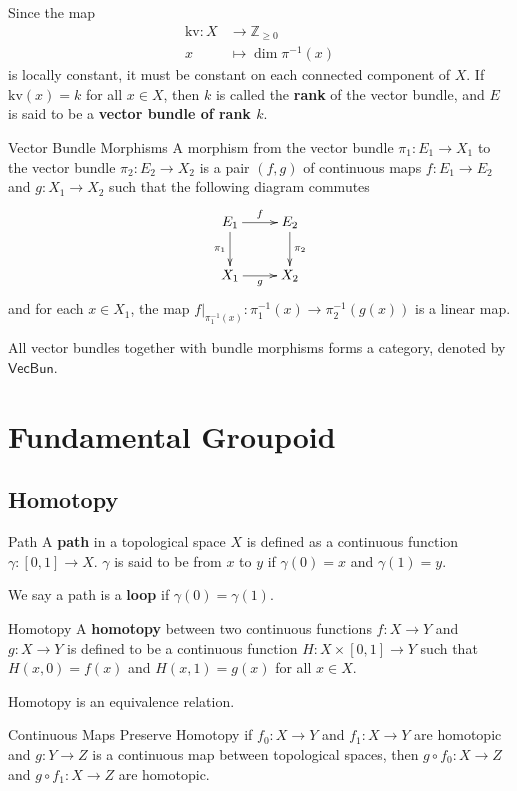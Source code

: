 \documentclass{report}
\begin{document}
Since the map 
\[
	\begin{aligned}
		\mathrm{kv}:X&\longrightarrow \mathbb{Z}_{\ge 0}\\
		x&\longmapsto \dim \pi^{-1}(x)
	\end{aligned}
\]
is locally constant, it must be constant on each connected component of $X$. If $\mathrm{kv}(x)=k$ for all $x\in X$, then $k$ is called the \textbf{rank} of the vector bundle, and $E$ is said to be a \textbf{vector bundle of rank $k$}.

\begin{definition}{Vector Bundle Morphisms}{}
	A morphism from the vector bundle $\pi_1: E_1\to X_1$ to the vector bundle $\pi_2: E_2\to X_2$ is a pair $(f,g)$ of continuous maps $f:E_1\to E_2$ and $g:X_1\to X_2$ such that the following diagram commutes
	\[\xymatrix{
		E_1\ar[d]_{\pi_1}\ar[r]^{f}  & E_2\ar[d]^{\pi_2}\\
		X_1\ar[r]_{g}&X_2
		}\]
	and for each $x\in X_1$, the map $\left.f\right|_{\pi_1^{-1}(x)}:\pi_1^{-1}(x)\to \pi_2^{-1}(g(x))$ is a linear map.
\end{definition}


All vector bundles together with bundle morphisms forms a category, denoted by $\mathsf{VecBun}$.

\chapter{Fundamental Groupoid}
\section{Homotopy}
\begin{definition}{Path}{}	
	A \textbf{path} in a topological space $X$ is defined as a continuous function $\gamma:[0,1]\to X$. $\gamma$ is said to be from $x$ to $y$ if $\gamma(0)=x$ and $\gamma(1)=y$.
\end{definition}

We say a path is a \textbf{loop} if $\gamma(0)=\gamma(1)$.

\begin{definition}{Homotopy}{}
	A \textbf{homotopy} between two continuous functions $f:X\to Y$ and $g:X\to Y$ is defined to be a continuous function $H: X \times[0,1] \rightarrow Y$ such that $H(x, 0)=f(x)$ and $H(x, 1)=g(x)$ for all $x \in X$.
\end{definition}

Homotopy is an equivalence relation.
\begin{proposition}{Continuous Maps Preserve Homotopy}{}
	if $f_0:X\to Y$ and $f_1:X\to Y$ are homotopic and $g:Y\to Z$ is a continuous map between topological spaces, then $g\circ f_0:X\to Z$ and $g\circ f_1:X\to Z$ are homotopic.
\end{proposition}
\end{document}
